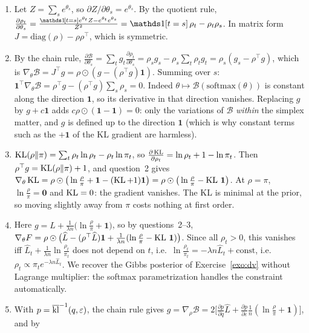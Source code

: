\documentclass[11pt]{article}
\newcounter{exo}
\begin{document}
\begin{solution}
\begin{enumerate}
\item Let $Z=\sum_se^{\theta_s}$, so $\partial Z/\partial\theta_s=e^{\theta_s}$. By the quotient rule,
      $\frac{\partial\rho_t}{\partial\theta_s}=\frac{\ind{t=s}e^{\theta_t}Z-e^{\theta_t}e^{\theta_s}}{Z^2}=\ind{t=s}\rho_t-\rho_t\rho_s$. In matrix form
      $J=\mathrm{diag}(\rho)-\rho\rho^\top$, which is symmetric.
\item By the chain rule, $\frac{\partial\mathcal B}{\partial\theta_s}=\sum_tg_t\frac{\partial\rho_t}{\partial\theta_s}=\rho_sg_s-\rho_s\sum_t\rho_tg_t=\rho_s(g_s-\rho^\top g)$,
      which is $\nabla_\theta\mathcal B=J^\top g=\rho\odot(g-(\rho^\top g)\mathbf1)$. Summing over $s$:
      $\mathbf1^\top\nabla_\theta\mathcal B=\rho^\top g-(\rho^\top g)\sum_s\rho_s=0$. Indeed $\theta\mapsto\mathcal B(\mathrm{softmax}(\theta))$ is constant along
      the direction $\mathbf 1$, so its derivative in that direction vanishes. Replacing $g$ by $g+c\mathbf 1$ adds
      $c\rho\odot(\mathbf1-\mathbf1)=0$: only the variations of $\mathcal B$ \emph{within} the simplex matter, and $g$ is defined up
      to the direction $\mathbf1$ (which is why constant terms such as the $+\mathbf1$ of the KL gradient are harmless).
\item $\operatorname{KL}(\rho\|\pi)=\sum_t\rho_t\ln\rho_t-\rho_t\ln\pi_t$, so $\frac{\partial\operatorname{KL}}{\partial\rho_t}=\ln\rho_t+1-\ln\pi_t$. Then
      $\rho^\top g=\operatorname{KL}(\rho\|\pi)+1$, and question~2 gives $\nabla_\theta\operatorname{KL}=\rho\odot\big(\ln\frac\rho\pi+\mathbf1-(\operatorname{KL}+1)\mathbf1\big)=\rho\odot\big(\ln\frac\rho\pi-\operatorname{KL}\,\mathbf1\big)$.
      At $\rho=\pi$, $\ln\frac\rho\pi=\mathbf0$ and $\operatorname{KL}=0$: the gradient vanishes. The KL is minimal at the prior, so moving
      slightly away from $\pi$ costs nothing at first order.
\item Here $g=\widehat L+\frac1{\lambda n}\big(\ln\frac\rho\pi+\mathbf1\big)$, so by questions~2--3,
      $\nabla_\theta F=\rho\odot\big(\widehat L-(\rho^\top\widehat L)\mathbf1+\frac1{\lambda n}(\ln\frac\rho\pi-\operatorname{KL}\,\mathbf1)\big)$. Since all $\rho_t>0$, this vanishes iff
      $\widehat L_t+\frac1{\lambda n}\ln\frac{\rho_t}{\pi_t}$ does not depend on $t$, i.e.\ $\ln\frac{\rho_t}{\pi_t}=-\lambda n\widehat L_t+\text{const}$, i.e.\
      $\rho_t\propto\pi_te^{-\lambda n\widehat L_t}$. We recover the Gibbs posterior of Exercise~\ref{exo:dv} without Lagrange
      multiplier: the softmax parametrization handles the constraint automatically.
\item With $p=\overline{\operatorname{kl}}^{-1}(q,\varepsilon)$, the chain rule gives $g=\nabla_\rho\mathcal B=2\big[\frac{\partial p}{\partial q}\widehat L+\frac{\partial p}{\partial\varepsilon}\frac1n(\ln\frac\rho\pi+\mathbf 1)\big]$, and by

\end{enumerate}
\end{solution}
\end{document}
